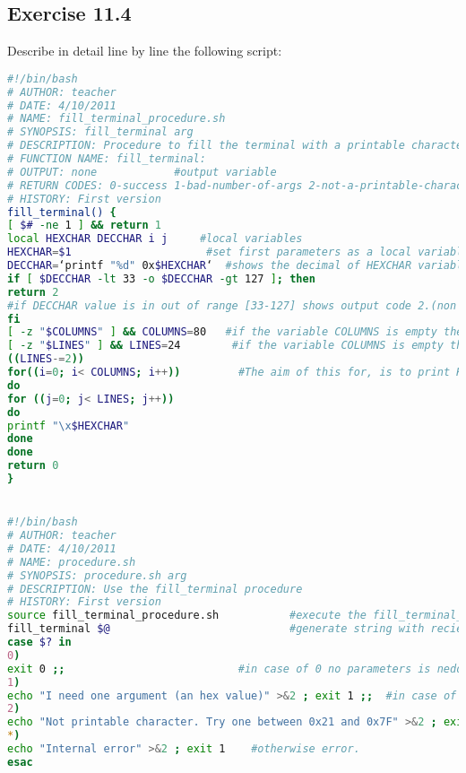 \documentclass[12pt, titlepage,]{article}
\begin{document}
\subsection{Exercise 11.4}
Describe in detail line by line the following script:
\begin{lstlisting}[language=Bash]
#!/bin/bash
# AUTHOR: teacher
# DATE: 4/10/2011
# NAME: fill_terminal_procedure.sh
# SYNOPSIS: fill_terminal arg
# DESCRIPTION: Procedure to fill the terminal with a printable character
# FUNCTION NAME: fill_terminal:
# OUTPUT: none            #output variable
# RETURN CODES: 0-success 1-bad-number-of-args 2-not-a-printable-character. #output codes
# HISTORY: First version
fill_terminal() {
[ $# -ne 1 ] && return 1
local HEXCHAR DECCHAR i j     #local variables
HEXCHAR=$1                     #set first parameters as a local variable Hexchar.
DECCHAR=‘printf "%d" 0x$HEXCHAR‘  #shows the decimal of HEXCHAR variables.
if [ $DECCHAR -lt 33 -o $DECCHAR -gt 127 ]; then
return 2               
#if DECCHAR value is in out of range [33-127] shows output code 2.(non printable char.)
fi
[ -z "$COLUMNS" ] && COLUMNS=80   #if the variable COLUMNS is empty then the value is 80.
[ -z "$LINES" ] && LINES=24        #if the variable COLUMNS is empty then the value is 24.
((LINES-=2))                        
for((i=0; i< COLUMNS; i++))         #The aim of this for, is to print HEXCHAR is all COLUMNS and LINES.
do
for ((j=0; j< LINES; j++))
do
printf "\x$HEXCHAR"
done
done
return 0
}


#!/bin/bash
# AUTHOR: teacher
# DATE: 4/10/2011
# NAME: procedure.sh
# SYNOPSIS: procedure.sh arg
# DESCRIPTION: Use the fill_terminal procedure
# HISTORY: First version
source fill_terminal_procedure.sh           #execute the fill_terminal_procedure.sh file
fill_terminal $@                            #generate string with recieved parameters.
case $? in
0)
exit 0 ;;                           #in case of 0 no parameters is nedded & the process is killed.
1)
echo "I need one argument (an hex value)" >&2 ; exit 1 ;;  #in case of 1, parameters are nedded, at least one.
2)
echo "Not printable character. Try one between 0x21 and 0x7F" >&2 ; exit 1 ;; #in case of 2, no char is printed.
*)
echo "Internal error" >&2 ; exit 1    #otherwise error.
esac
\end{lstlisting}
\end{document}
